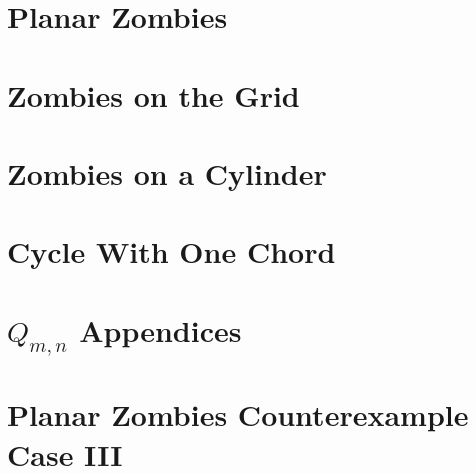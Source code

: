 \documentclass[letterpaper, 12pt]{report}
\theoremstyle{definition}
\begin{document}
\section{Planar Zombies}


\section{Zombies on the Grid}


\section{Zombies on a Cylinder}


\section{Cycle With One Chord}



\newpage



\newpage
\appendix
\section{$Q_{m, n}$ Appendices}


\newpage
\section{Planar Zombies Counterexample Case III}

\end{document}
